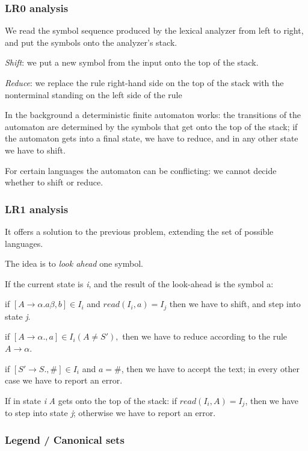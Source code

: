 \documentclass[margin=0px]{article}
\begin{document}
\subsubsection{LR0 analysis}

We read the symbol sequence produced by the lexical analyzer from left to
right, and put the symbols onto the analyzer's stack.

\textit{Shift}: we put a new symbol from the input onto the top of the
stack.

\textit{Reduce}: we replace the rule right-hand side on the top of the stack
with the nonterminal standing on the left side of the rule

In the background a deterministic finite automaton works:
the transitions of the automaton are determined by the symbols that get onto the top of the stack;
if the automaton gets into a final state, we have to reduce,
and in any other state we have to shift.

For certain languages the automaton can be conflicting: we cannot decide whether to shift or reduce.

\subsubsection{LR1 analysis}

It offers a solution to the previous problem, extending the set of possible languages.

The idea is to \textit{look ahead} one symbol.

If the current state is \textit{i}, and the result of the look-ahead is the
symbol a:

if $ [A	\rightarrow \alpha.a\beta, b] \in I_i $ and $read(I_i, a) = I_j$
then we have to shift, and step into state \textit{j}.


if $ [A	\rightarrow \alpha., a] \in I_i (A \neq S'), $
then we have to reduce according to the rule $ A \rightarrow \alpha $.




if $ [S' \rightarrow S., \#] \in I_i $ and $ a = \# $, then we have to accept the text;	in every other case we have to report an error.

If in state \textit{i} \textit{A} gets onto the top of the stack:
if $  read(I_i,A) =	I_j $,
then we have to step into state \textit{j};	otherwise we have to report an error.



\subsubsection{Legend / Canonical sets}
\end{document}
